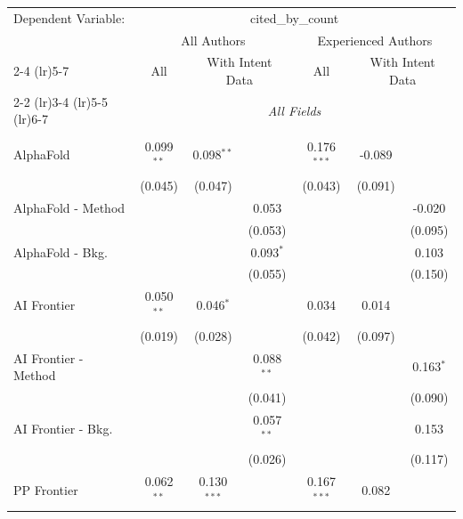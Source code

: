 \begingroup
\centering
\begin{tabular}{lcccccc}
   \tabularnewline \midrule \midrule
   Dependent Variable: & \multicolumn{6}{c}{cited\_by\_count}\\
 & \multicolumn{3}{c}{All Authors} & \multicolumn{3}{c}{Experienced Authors} \\
\cmidrule(lr){2-4} \cmidrule(lr){5-7}
 & \multicolumn{1}{c}{All} & \multicolumn{2}{c}{With Intent Data} & \multicolumn{1}{c}{All} & \multicolumn{2}{c}{With Intent Data} \\
\cmidrule(lr){2-2} \cmidrule(lr){3-4} \cmidrule(lr){5-5} \cmidrule(lr){6-7}
 & \multicolumn{6}{c}{\textit{All Fields}} \\ \\
   AlphaFold            & 0.099$^{**}$  & 0.098$^{**}$  &               & 0.176$^{***}$ & -0.089  &   \\   
                        & (0.045)       & (0.047)       &               & (0.043)       & (0.091) &   \\   
   AlphaFold - Method   &               &               & 0.053         &               &         & -0.020\\   
                        &               &               & (0.053)       &               &         & (0.095)\\   
   AlphaFold - Bkg.     &               &               & 0.093$^{*}$   &               &         & 0.103\\   
                        &               &               & (0.055)       &               &         & (0.150)\\   
   AI Frontier          & 0.050$^{**}$  & 0.046$^{*}$   &               & 0.034         & 0.014   &   \\   
                        & (0.019)       & (0.028)       &               & (0.042)       & (0.097) &   \\   
   AI Frontier - Method &               &               & 0.088$^{**}$  &               &         & 0.163$^{*}$\\   
                        &               &               & (0.041)       &               &         & (0.090)\\   
   AI Frontier - Bkg.   &               &               & 0.057$^{**}$  &               &         & 0.153\\   
                        &               &               & (0.026)       &               &         & (0.117)\\   
   PP Frontier          & 0.062$^{**}$  & 0.130$^{***}$ &               & 0.167$^{***}$ & 0.082   &   \\   

\end{tabular}
